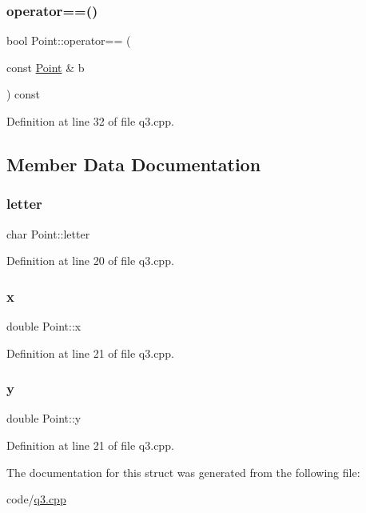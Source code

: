 \mbox{\label{struct_point_affed2941d46a0f1bfe40540506e99e5e}} 
\subsubsection{\texorpdfstring{operator==()}{operator==()}}
{\footnotesize\ttfamily bool Point\+::operator== (\begin{DoxyParamCaption}\item[{const \hyperlink{struct_point}{Point} \&}]{b }\end{DoxyParamCaption}) const\hspace{0.3cm}{\ttfamily [inline]}}



Definition at line 32 of file q3.\+cpp.



\subsection{Member Data Documentation}
\mbox{\label{struct_point_ac0df42bfe41b1cc24cca14a53b96ae16}} 
\subsubsection{\texorpdfstring{letter}{letter}}
{\footnotesize\ttfamily char Point\+::letter}



Definition at line 20 of file q3.\+cpp.

\mbox{\label{struct_point_ab99c56589bc8ad5fa5071387110a5bc7}} 
\subsubsection{\texorpdfstring{x}{x}}
{\footnotesize\ttfamily double Point\+::x}



Definition at line 21 of file q3.\+cpp.

\mbox{\label{struct_point_afa38be143ae800e6ad69ce8ed4df62d8}} 
\subsubsection{\texorpdfstring{y}{y}}
{\footnotesize\ttfamily double Point\+::y}



Definition at line 21 of file q3.\+cpp.



The documentation for this struct was generated from the following file\+:\begin{DoxyCompactItemize}
\item 
code/\hyperlink{q3_8cpp}{q3.\+cpp}\end{DoxyCompactItemize}
